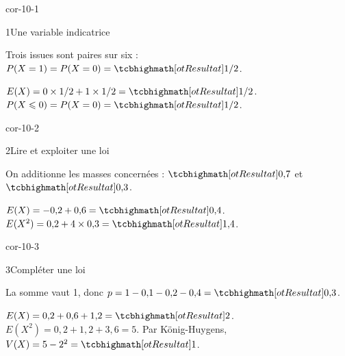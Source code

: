 \corrigesSouples

\begin{blocLivre}{cor-10-1}
\begin{corrige}{1}{Une variable indicatrice}
\begin{questions}
\item Trois issues sont paires sur six : $P(X=1)=P(X=0)=\res{1/2}$.
\item $E(X)=0\times1/2+1\times1/2=\res{1/2}$. $P(X\leq0)=P(X=0)=\res{1/2}$.
\end{questions}
\label{figlivre-r10-01-loi-cor}

\end{corrige}
\end{blocLivre}
\begin{blocLivre}{cor-10-2}
\begin{corrige}{2}{Lire et exploiter une loi}
\begin{questions}
\item On additionne les masses concernées : $\res{0{,}7}$ et $\res{0{,}3}$.
\item $E(X)=-0{,}2+0{,}6=\res{0{,}4}$. $E(X^2)=0{,}2+4\times0{,}3=\res{1{,}4}$.
\end{questions}
\end{corrige}
\end{blocLivre}
\begin{blocLivre}{cor-10-3}
\begin{corrige}{3}{Compléter une loi}
\begin{questions}
\item La somme vaut 1, donc $p=1-0{,}1-0{,}2-0{,}4=\res{0{,}3}$.
\item $E(X)=0{,}2+0{,}6+1{,}2=\res{2}$. $E(X^2)=0{,}2+1{,}2+3{,}6=5$. Par König-Huygens, $V(X)=5-2^2=\res{1}$.
\end{questions}
\label{figlivre-r10-03-loi-cor}

\end{corrige}
\end{blocLivre}
